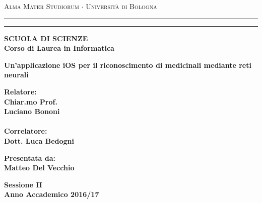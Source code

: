 \documentclass[12pt,a4paper]{report}
\begin{document}
\begin{titlepage}
\begin{center}
{{\Large{\textsc{Alma Mater Studiorum $\cdot$ Universit\`a di
Bologna}}}} \rule[0.1cm]{15.8cm}{0.1mm}
\rule[0.5cm]{15.8cm}{0.6mm}
{\bf SCUOLA DI SCIENZE\\
Corso di Laurea in Informatica }
\end{center}
\vspace{35mm}
\begin{center}
{\LARGE{\bf Un'applicazione iOS per il riconoscimento di medicinali mediante reti neurali}}\\
\end{center}
\vspace{40mm}
\par
\noindent
\begin{minipage}[t]{0.47\textwidth}
{\large{\bf Relatore:\\
Chiar.mo Prof.\\
Luciano Bononi}}\\\\
{\large{\bf Correlatore:\\
Dott. Luca Bedogni}}
\end{minipage}
\hfill
\begin{minipage}[t]{0.47\textwidth}\raggedleft
{\large{\bf Presentata da:\\
Matteo Del Vecchio}}
\end{minipage}
\vspace{20mm}
\begin{center}
{\large{\bf Sessione II\\%
Anno Accademico 2016/17}}%
\end{center}
\end{titlepage}
\end{document}
